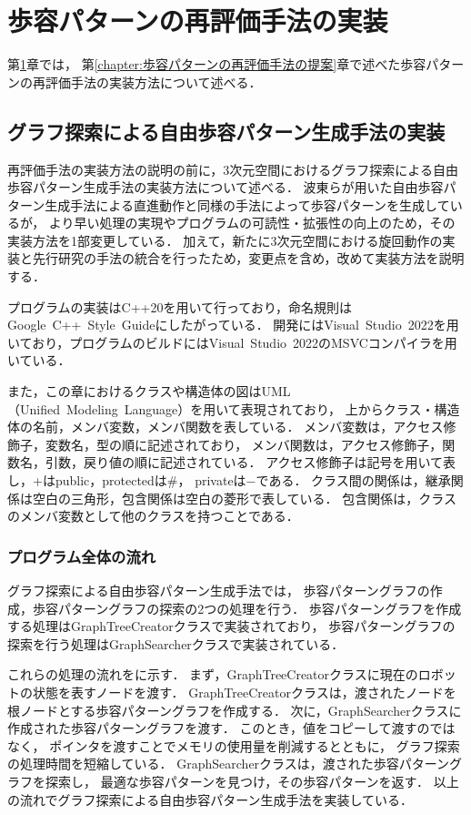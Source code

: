﻿%

\chapter{歩容パターンの再評価手法の実装}\label{chapter:歩容パターンの再評価手法の実装}
第\ref{chapter:歩容パターンの再評価手法の実装}章では，
第\ref{chapter:歩容パターンの再評価手法の提案}章で述べた歩容パターンの再評価手法の実装方法について述べる．

\section{グラフ探索による自由歩容パターン生成手法の実装}
再評価手法の実装方法の説明の前に，3次元空間におけるグラフ探索による自由歩容パターン生成手法の実装方法について述べる．
波東らが用いた自由歩容パターン生成手法による直進動作と同様の手法によって歩容パターンを生成しているが，
より早い処理の実現やプログラムの可読性・拡張性の向上のため，その実装方法を1部変更している．
加えて，新たに3次元空間における旋回動作の実装と先行研究の手法の統合を行ったため，変更点を含め，改めて実装方法を説明する．

プログラムの実装はC++20を用いて行っており，命名規則はGoogle~C++~Style~Guide\cite{cita:google_cpp_style_guide}にしたがっている．
開発にはVisual~Studio~2022を用いており，プログラムのビルドにはVisual~Studio~2022のMSVCコンパイラを用いている．

また，この章におけるクラスや構造体の図はUML（Unified~Modeling~Language）を用いて表現されており，
上からクラス・構造体の名前，メンバ変数，メンバ関数を表している．
メンバ変数は，アクセス修飾子，変数名，型の順に記述されており，
メンバ関数は，アクセス修飾子，関数名，引数，戻り値の順に記述されている．
アクセス修飾子は記号を用いて表し，+はpublic，protectedは\#，
privateは$-$である．
クラス間の関係は，継承関係は空白の三角形，包含関係は空白の菱形で表している．
包含関係は，クラスのメンバ変数として他のクラスを持つことである．

\subsection{プログラム全体の流れ}
グラフ探索による自由歩容パターン生成手法では，
歩容パターングラフの作成，歩容パターングラフの探索の2つの処理を行う．
歩容パターングラフを作成する処理はGraphTreeCreatorクラスで実装されており，
歩容パターングラフの探索を行う処理はGraphSearcherクラスで実装されている．

これらの処理の流れをに示す．
まず，GraphTreeCreatorクラスに現在のロボットの状態を表すノードを渡す．
GraphTreeCreatorクラスは，渡されたノードを根ノードとする歩容パターングラフを作成する．
次に，GraphSearcherクラスに作成された歩容パターングラフを渡す．
このとき，値をコピーして渡すのではなく，
ポインタを渡すことでメモリの使用量を削減するとともに，
グラフ探索の処理時間を短縮している．
GraphSearcherクラスは，渡された歩容パターングラフを探索し，
最適な歩容パターンを見つけ，その歩容パターンを返す．
以上の流れでグラフ探索による自由歩容パターン生成手法を実装している．

